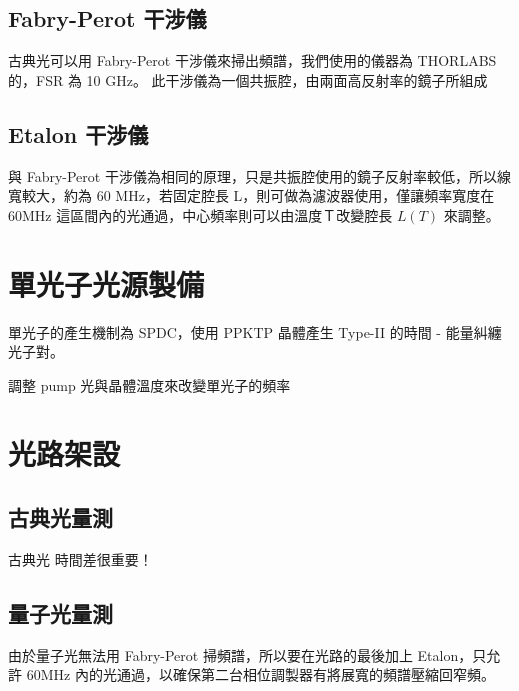 \documentclass[class=NCU_thesis, crop=false]{standalone}
\begin{document}
\subsection{Fabry-Perot 干涉儀}
古典光可以用 Fabry-Perot 干涉儀來掃出頻譜，我們使用的儀器為 THORLABS 的，FSR 為 10 GHz。
此干涉儀為一個共振腔，由兩面高反射率的鏡子所組成

\subsection{Etalon 干涉儀}
與 Fabry-Perot 干涉儀為相同的原理，只是共振腔使用的鏡子反射率較低，所以線寬較大，約為 60 MHz，若固定腔長 L，則可做為濾波器使用，僅讓頻率寬度在 60MHz 這區間內的光通過，中心頻率則可以由溫度Ｔ改變腔長 $L(T)$ 來調整。

\section{單光子光源製備}
單光子的產生機制為 SPDC，使用 PPKTP 晶體產生 Type-II 的時間 - 能量糾纏光子對。

調整 pump 光與晶體溫度來改變單光子的頻率

\section{光路架設}
\subsection{古典光量測}
古典光
時間差很重要！
\subsection{量子光量測}
由於量子光無法用 Fabry-Perot 掃頻譜，所以要在光路的最後加上 Etalon，只允許 60MHz 內的光通過，以確保第二台相位調製器有將展寬的頻譜壓縮回窄頻。
\end{document}
